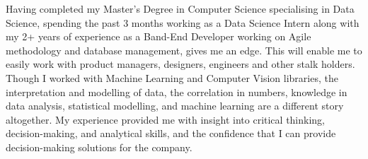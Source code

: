Having completed my Master’s Degree in Computer Science specialising in Data Science, spending the past 3 months working as a Data Science Intern along with my 2+ years of experience as a Band-End Developer working on Agile methodology and database management, gives me an edge. 
This will enable me to easily work with product managers, designers, engineers and other stalk holders.
{Though I worked with Machine Learning and Computer Vision libraries, the interpretation and modelling of data, the correlation in numbers, knowledge in data analysis, statistical modelling, and machine learning are a different story altogether.}
My experience provided me with insight into critical thinking, decision-making, and analytical skills, and the confidence that I can provide decision-making solutions for the company.